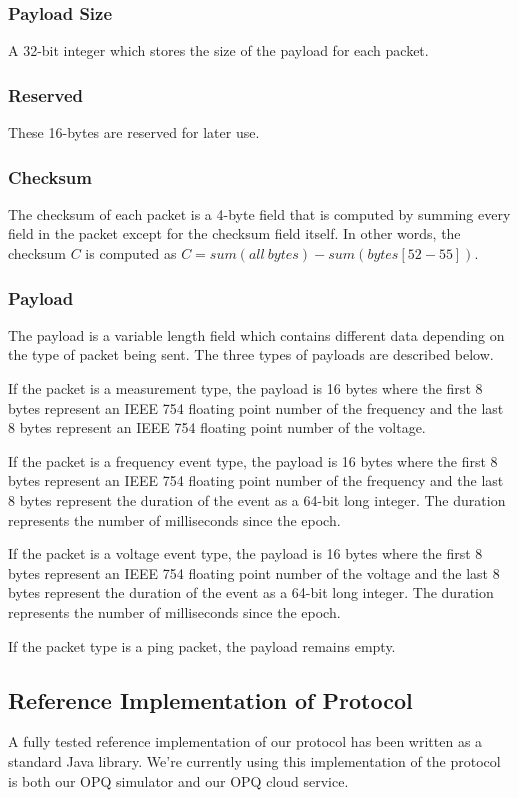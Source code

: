 \documentclass[11pt]{article}
\begin{document}
\subsubsection{Payload Size}
A 32-bit integer which stores the size of the payload for each packet.

\subsubsection{Reserved}
These 16-bytes are reserved for later use.

\subsubsection{Checksum}
The checksum of each packet is a 4-byte field that is computed by summing every field in the packet except for the checksum field itself. In other words, the checksum $C$ is computed as $C=sum(all\ bytes) - sum(bytes[52-55])$. 

\subsubsection{Payload}
The payload is a variable length field which contains different data depending on the type of packet being sent. The three types of payloads are described below.

If the packet is a measurement type, the payload is 16 bytes where the first 8 bytes represent an IEEE 754 floating point number of the frequency and the last 8 bytes represent an IEEE 754 floating point number of the voltage.

If the packet is a frequency event type, the payload is 16 bytes where the first 8 bytes represent an IEEE 754 floating point number of the frequency and the last 8 bytes represent the duration of the event as a 64-bit long integer. The duration represents the number of milliseconds since the epoch.

If the packet is a voltage event type, the payload is 16 bytes where the first 8 bytes represent an IEEE 754 floating point number of the voltage and the last 8 bytes represent the duration of the event as a 64-bit long integer. The duration represents the number of milliseconds since the epoch.

If the packet type is a ping packet, the payload remains empty.

\subsection{Reference Implementation of Protocol}
A fully tested reference implementation of our protocol has been written as a standard Java library. We're currently using this implementation of the protocol is both our OPQ simulator and our OPQ cloud service.
\end{document}
